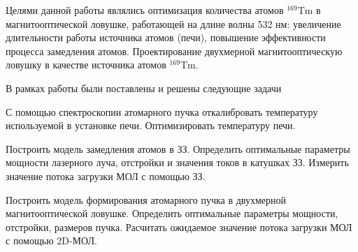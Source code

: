 




Целями данной работы являлись оптимизация количества атомов ${}^{169}$Tm в магнитооптической ловушке, работающей на длине волны 532 нм: увеличение длительности работы источника атомов (печи), повышение эффективности процесса замедления атомов. Проектирование двухмерной магнитооптическую ловушку в качестве источника атомов ${}^{169}$Tm.

В рамках работы были поставлены и решены следующие задачи 
\begin{enumerate*}
	\item С помощью спектроскопии атомарного пучка откалибровать температуру используемой в установке печи. Оптимизировать температуру печи.
	\item Построить модель замедления атомов в ЗЗ. Определить оптимальные параметры мощности лазерного луча, отстройки и значения токов в катушках ЗЗ. Измерить значение потока загрузки МОЛ с помощью ЗЗ.
	\item Построить модель формирования атомарного пучка в двухмерной магнитооптической ловушке. Определить оптимальные параметры мощности, отстройки, размеров пучка. Расчитать ожидаемое значение потока загрузки МОЛ с помощью 2D-МОЛ.
\end{enumerate*}


